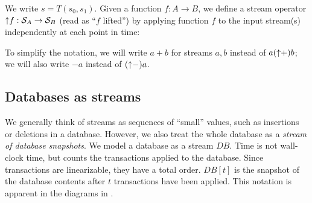 \begin{center}
\end{center}

We write $s = T(s_0, s_1)$.
Given a function $f: A \to B$, we define a stream operator ${\uparrow}f
:\mathcal{S}_{A} \to \mathcal{S}_{B}$ (read as ``$f$ lifted'') by applying
function $f$ to the input stream(s) independently at each point in
time:
\begin{center}
\end{center}

To simplify the notation, we will write $a + b$ for streams $a, b$
instead of $a ({\uparrow}+) b$; we will also write $-a$ instead of
$({\uparrow}-)a$.

\subsection{Databases as streams}

We generally think of streams as sequences of ``small'' values, such
as insertions or deletions in a database.  However, we also treat the
whole database as a \emph{stream of database snapshots}.  We model a
database as a stream $DB$.  Time is not wall-clock time, but counts
the transactions applied to the database.  Since transactions are
linearizable, they have a total order.  $DB[t]$ is the snapshot of the
database contents after $t$ transactions have been applied.  This
notation is apparent in the diagrams in .

